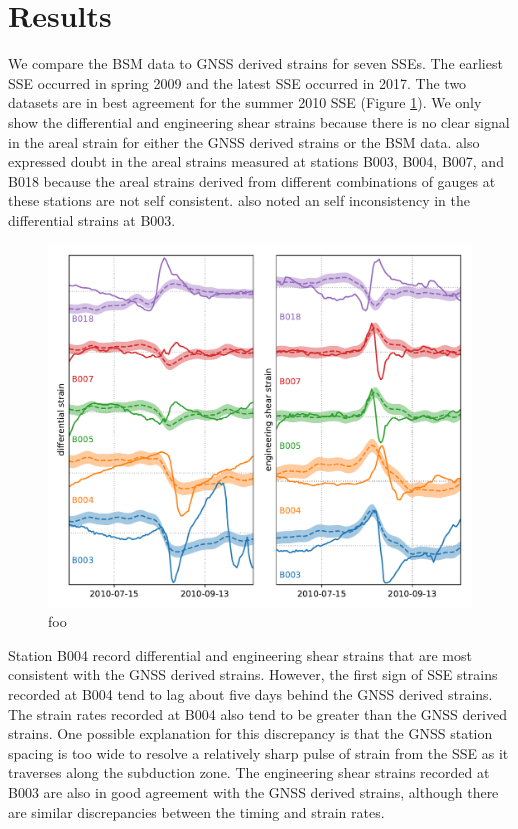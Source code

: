\documentclass[10pt,a4paper]{article}
\begin{document}
\section{Results}
We compare the BSM data to GNSS derived strains for seven SSEs. The earliest SSE occurred in spring 2009 and the latest SSE occurred in 2017. The two datasets are in best agreement for the summer 2010 SSE (Figure \ref{fig:SSE1}). We only show the differential and engineering shear strains because there is no clear signal in the areal strain for either the GNSS derived strains or the BSM data. \citet{Roeloffs2010} also expressed doubt in the areal strains measured at stations B003, B004, B007, and B018 because the areal strains derived from different combinations of gauges at these stations are not self consistent. \citet{Roeloffs2010} also noted an self inconsistency in the differential strains at B003. 

\begin{figure}
\includegraphics{figures/SSE1.pdf}
\caption{foo}   
\label{fig:SSE1}
\end{figure}

Station B004 record differential and engineering shear strains that are most consistent with the GNSS derived strains. However, the first sign of SSE strains recorded at B004 tend to lag about five days behind the GNSS derived strains. The strain rates recorded at B004 also tend to be greater than the GNSS derived strains. One possible explanation for this discrepancy is that the GNSS station spacing is too wide to resolve a relatively sharp pulse of strain from the SSE as it traverses along the subduction zone. The engineering shear strains recorded at B003 are also in good agreement with the GNSS derived strains, although there are similar discrepancies between the timing and strain rates.
\end{document}
